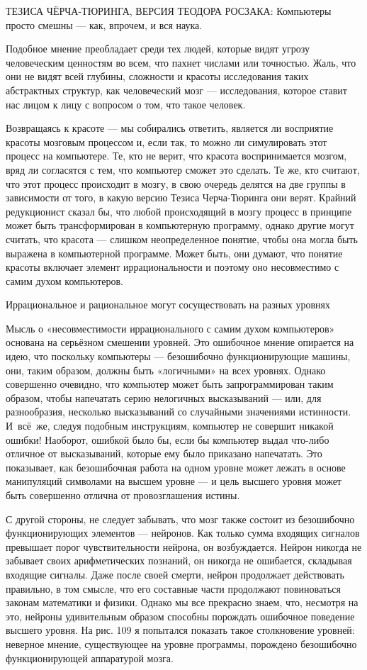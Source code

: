 \documentclass[../main.tex]{subfiles}
\begin{document}
ТЕЗИСА ЧЁРЧА-ТЮРИНГА, ВЕРСИЯ ТЕОДОРА РОСЗАКА: Компьютеры просто смешны --- как, впрочем, и вся наука.

Подобное мнение преобладает среди тех людей, которые видят угрозу человеческим ценностям во всем, что пахнет числами или точностью. Жаль, что они не видят всей глубины, сложности и красоты исследования таких абстрактных структур, как человеческий мозг --- исследования, которое ставит нас лицом к лицу с вопросом о том, что такое человек.

Возвращаясь к красоте --- мы собирались ответить, является ли восприятие красоты мозговым процессом и, если так, то можно ли симулировать этот процесс на компьютере. Те, кто не верит, что красота воспринимается мозгом, вряд ли согласятся с тем, что компьютер сможет это сделать. Те же, кто считают, что этот процесс происходит в мозгу, в свою очередь делятся на две группы в зависимости от того, в какую версию Тезиса Черча-Тюринга они верят. Крайний редукционист сказал бы, что любой происходящий в мозгу процесс в принципе может быть трансформирован в компьютерную программу, однако другие могут считать, что красота --- слишком неопределенное понятие, чтобы она могла быть выражена в компьютерной программе. Может быть, они думают, что понятие красоты включает элемент иррациональности и поэтому оно несовместимо с самим духом компьютеров.

Иррациональное и рациональное могут сосуществовать на разных уровнях

Мысль о «несовместимости иррационального с самим духом компьютеров» основана на серьёзном смешении уровней. Это ошибочное мнение опирается на идею, что поскольку компьютеры --- безошибочно функционирующие машины, они, таким образом, должны быть «логичными» на всех уровнях. Однако совершенно очевидно, что компьютер может быть запрограммирован таким образом, чтобы напечатать серию нелогичных высказываний --- или, для разнообразия, несколько высказываний со случайными значениями истинности. И~всё~же, следуя подобным инструкциям, компьютер не совершит никакой ошибки! Наоборот, ошибкой было бы, если бы компьютер выдал что-либо отличное от высказываний, которые ему было приказано напечатать. Это показывает, как безошибочная работа на одном уровне может лежать в основе манипуляций символами на высшем уровне --- и цель высшего уровня может быть совершенно отлична от провозглашения истины.

С другой стороны, не следует забывать, что мозг также состоит из безошибочно функционирующих элементов --- нейронов. Как только сумма входящих сигналов превышает порог чувствительности нейрона, он возбуждается. Нейрон никогда не забывает своих арифметических познаний, он никогда не ошибается, складывая входящие сигналы. Даже после своей смерти, нейрон продолжает действовать правильно, в том смысле, что его составные части продолжают повиноваться законам математики и физики. Однако мы все прекрасно знаем, что, несмотря на это, нейроны удивительным образом способны порождать ошибочное поведение высшего уровня. На рис. 109 я попытался показать такое столкновение уровней: неверное мнение, существующее на уровне программы, порождено безошибочно функционирующей аппаратурой мозга.
\end{document}
